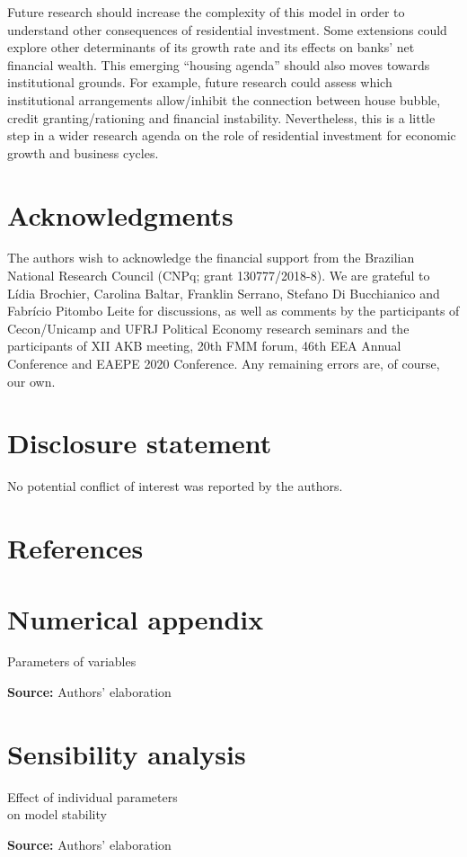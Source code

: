 \documentclass[12pt]{article}
\begin{document}
Future research should increase the complexity of this model in order to understand other consequences of residential investment.
Some extensions could explore other determinants of its growth rate and  its effects on banks' net financial wealth.
This emerging ``housing agenda'' should also moves towards institutional grounds.
For example, future research could assess which institutional arrangements allow/inhibit the connection between house bubble, credit granting/rationing and financial instability.
Nevertheless, this is a little step in a wider research agenda on the role of residential investment for economic growth and business cycles.


\section*{Acknowledgments}
\label{sec:org477d7eb}
The authors wish to acknowledge the financial support from the Brazilian National Research Council (CNPq; grant 130777/2018-8). We  are  grateful  to  Lídia  Brochier,  Carolina  Baltar,  Franklin  Serrano, Stefano Di Bucchianico  and Fabrício Pitombo Leite for  discussions,  as  well  as  comments  by  the participants of Cecon/Unicamp and UFRJ Political Economy research seminars and the participants of XII AKB meeting, 20th FMM forum, 46th EEA Annual Conference and EAEPE 2020 Conference. Any remaining errors are, of course, our own.

\section*{Disclosure statement}
\label{sec:org56d480e}
No potential conflict of interest was reported by the authors.


\section*{References}
\label{sec:orga14824f}
\printbibliography[heading=none]


\appendix

\section{Numerical appendix}
\label{sec:org16ca2d9}
\label{append:Data}


\begin{table}[H]
\caption{Parameters of variables}
\centering
\label{tab:param}

\caption*{\textbf{Source:} Authors' elaboration}
\end{table}

\section{Sensibility analysis}
\label{sec:org8993025}
\label{append:Sensib}
\begin{table}[H]
\caption{Effect of individual parameters\\on model stability}
\label{tab:sensibility}
\centering

\caption*{\textbf{Source:} Authors' elaboration}
\end{table}
\end{document}
